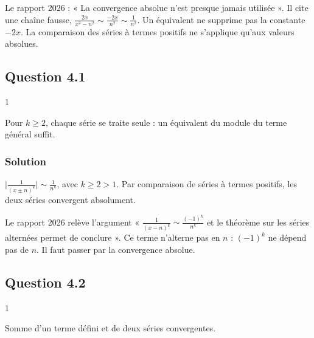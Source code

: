 \documentclass[11pt,a4paper]{article}
\begin{document}
\begin{jury}

Le rapport 2026 : « La convergence absolue n'est presque jamais utilisée ». Il cite une chaîne fausse, \(\frac{2x}{x^2-n^2}\sim\frac{-2x}{n^2}\sim\frac1{n^2}\). Un équivalent ne supprime pas la constante \(-2x\). La comparaison des séries à termes positifs ne s'applique qu'aux valeurs absolues.

\end{jury}

\hypertarget{question-4.1-1}{%
\subsection{Question 4.1}\label{question-4.1-1}}

\begin{indication}{1}

Pour \(k\ge2\), chaque série se traite seule : un équivalent du module du terme général suffit.

\end{indication}

\hypertarget{solution-20}{%
\subsubsection{Solution}\label{solution-20}}

\(\big|\frac1{(x\pm n)^k}\big|\sim\frac1{n^k}\), avec \(k\ge2>1\). Par comparaison de séries à termes positifs, les deux séries convergent absolument.

\begin{piege}

Le rapport 2026 relève l'argument « \(\frac1{(x-n)^k}\sim\frac{(-1)^k}{n^k}\) et le théorème sur les séries alternées permet de conclure ». Ce terme n'alterne pas en \(n\) : \((-1)^k\) ne dépend pas de \(n\). Il faut passer par la convergence absolue.

\end{piege}

\hypertarget{question-4.2-1}{%
\subsection{Question 4.2}\label{question-4.2-1}}

\begin{indication}{1}

Somme d'un terme défini et de deux séries convergentes.

\end{indication}
\end{document}
